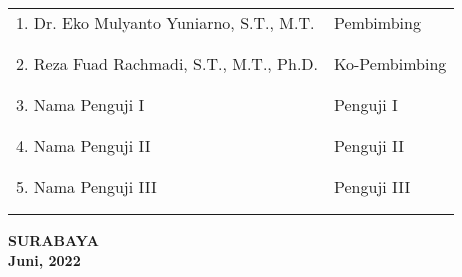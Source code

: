   \begingroup
    \setlength{\tabcolsep}{0pt}

    \noindent
    \begin{tabularx}{\textwidth}{X l}
      1. Dr. Eko Mulyanto Yuniarno, S.T., M.T.          & Pembimbing \\
      &  \\
      &  \\
      2. Reza Fuad Rachmadi, S.T., M.T., Ph.D.     & Ko-Pembimbing \\
      &  \\
      &  \\
      3. Nama Penguji I               & Penguji I \\
      &  \\
      &  \\
      4. Nama Penguji II              & Penguji II \\
      &  \\
      &  \\
      5. Nama Penguji III             & Penguji III \\
      &  \\
      &  \\
    \end{tabularx}
  \endgroup

  \vspace{12ex}

  \begin{center}
    \textbf{SURABAYA\\Juni, 2022}
  \end{center}
\endgroup
